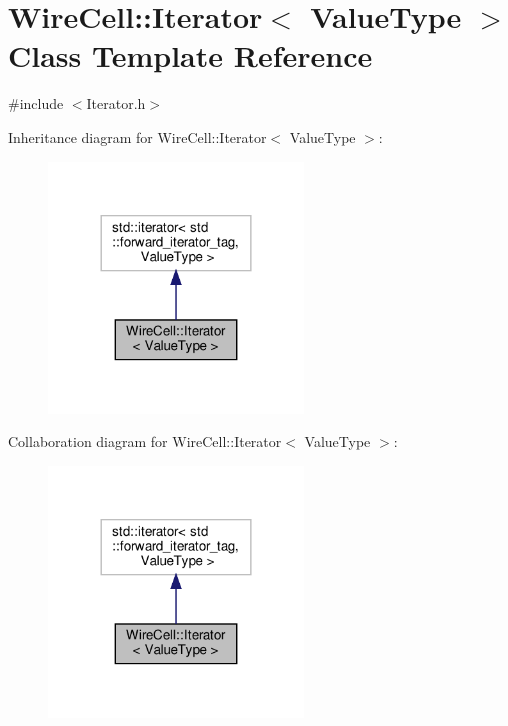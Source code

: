 \hypertarget{class_wire_cell_1_1_iterator}{}\section{Wire\+Cell\+:\+:Iterator$<$ Value\+Type $>$ Class Template Reference}
\label{class_wire_cell_1_1_iterator}


{\ttfamily \#include $<$Iterator.\+h$>$}



Inheritance diagram for Wire\+Cell\+:\+:Iterator$<$ Value\+Type $>$\+:
\nopagebreak
\begin{figure}[H]
\begin{center}
\leavevmode
\includegraphics[width=192pt]{class_wire_cell_1_1_iterator__inherit__graph}
\end{center}
\end{figure}


Collaboration diagram for Wire\+Cell\+:\+:Iterator$<$ Value\+Type $>$\+:
\nopagebreak
\begin{figure}[H]
\begin{center}
\leavevmode
\includegraphics[width=192pt]{class_wire_cell_1_1_iterator__coll__graph}
\end{center}
\end{figure}
